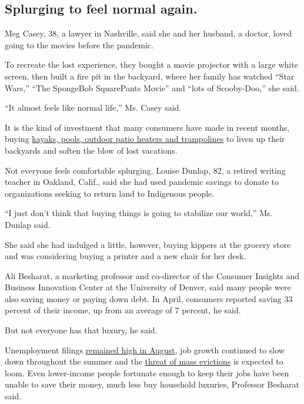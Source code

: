 \hypertarget{splurging-to-feel-normal-again}{%
\subsection{Splurging to feel normal
again.}\label{splurging-to-feel-normal-again}}

Meg Casey, 38, a lawyer in Nashville, said she and her husband, a
doctor, loved going to the movies before the pandemic.

To recreate the lost experience, they bought a movie projector with a
large white screen, then built a fire pit in the backyard, where her
family has watched ``Star Wars,'' ``The SpongeBob SquarePants Movie''
and ``lots of Scooby-Doo,'' she said.

``It almost feels like normal life,'' Ms. Casey said.

It is the kind of investment that many consumers have made in recent
months, buying
\href{https://www.nytimes3xbfgragh.onion/2020/08/04/style/outdoor-camping-gear-pools-backordered.html}{kayaks,
pools, outdoor patio heaters and trampolines} to liven up their
backyards and soften the blow of lost vacations.

Not everyone feels comfortable splurging. Louise Dunlap, 82, a retired
writing teacher in Oakland, Calif., said she had used pandemic savings
to donate to organizations seeking to return land to Indigenous people.

``I just don't think that buying things is going to stabilize our
world,'' Ms. Dunlap said.

She said she had indulged a little, however, buying kippers at the
grocery store and was considering buying a printer and a new chair for
her desk.

Ali Besharat, a marketing professor and co-director of the Consumer
Insights and Business Innovation Center at the University of Denver,
said many people were also saving money or paying down debt. In April,
consumers reported saving 33 percent of their income, up from an average
of 7 percent, he said.

But not everyone has that luxury, he said.

Unemployment filings
\href{https://www.nytimes3xbfgragh.onion/2020/08/27/business/economy/unemployment-claims.html}{remained
high in August}, job growth continued to slow down throughout the summer
and the
\href{https://www.nytimes3xbfgragh.onion/2020/08/07/business/economy/housing-economy-eviction-renters.html}{threat
of mass evictions} is expected to loom. Even lower-income people
fortunate enough to keep their jobs have been unable to save their
money, much less buy household luxuries, Professor Besharat said.

